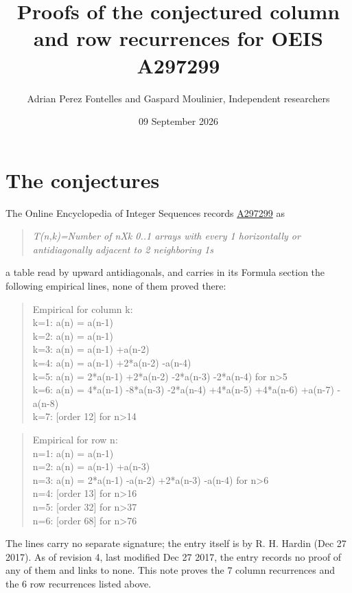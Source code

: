 \documentclass[11pt]{article}
\title{Proofs of the conjectured column and row recurrences for OEIS A297299}
\author{Adrian Perez Fontelles and Gaspard Moulinier, Independent researchers}
\date{09 September 2026}
\theoremstyle{definition}
\begin{document}
\maketitle
\section{The conjectures}

The Online Encyclopedia of Integer Sequences records \href{https://oeis.org/A297299}{A297299} as

\begin{quote}\itshape T(n,k)=Number of nXk 0..1 arrays with every 1 horizontally or antidiagonally adjacent to 2 neighboring 1s\end{quote}

a table read by upward antidiagonals, and carries in its Formula section the following empirical lines, none of them proved there:

\begin{quote}\ttfamily Empirical for column k:\\
k=1: a(n) = a(n-1)\\k=2: a(n) = a(n-1)\\k=3: a(n) = a(n-1) +a(n-2)\\k=4: a(n) = a(n-1) +2*a(n-2) -a(n-4)\\k=5: a(n) = 2*a(n-1) +2*a(n-2) -2*a(n-3) -2*a(n-4) for n>5\\k=6: a(n) = 4*a(n-1) -8*a(n-3) -2*a(n-4) +4*a(n-5) +4*a(n-6) +a(n-7) -a(n-8)\\k=7: [order 12] for n>14\end{quote}

\begin{quote}\ttfamily Empirical for row n:\\
n=1: a(n) = a(n-1)\\n=2: a(n) = a(n-1) +a(n-3)\\n=3: a(n) = 2*a(n-1) -a(n-2) +2*a(n-3) -a(n-4) for n>6\\n=4: [order 13] for n>16\\n=5: [order 32] for n>37\\n=6: [order 68] for n>76\end{quote}

The lines carry no separate signature; the entry itself is by R. H. Hardin (Dec 27 2017). As of revision 4, last modified Dec 27 2017, the entry records no proof of any of them and links to none. This note proves the 7 column recurrences and the 6 row recurrences listed above.
\end{document}
